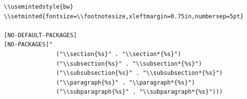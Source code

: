 \documentclass[10pt]{article}
\begin{document}
\begin{verbatim}
\\usemintedstyle{bw}
\\setminted{fontsize=\\footnotesize,xleftmargin=0.75in,numbersep=5pt}

[NO-DEFAULT-PACKAGES]
[NO-PACKAGES]"
               ("\\section{%s}" . "\\section*{%s}")
               ("\\subsection{%s}" . "\\subsection*{%s}")
               ("\\subsubsection{%s}" . "\\subsubsection*{%s}")
               ("\\paragraph{%s}" . "\\paragraph*{%s}")
               ("\\subparagraph{%s}" . "\\subparagraph*{%s}")))



\end{verbatim}
\end{document}
